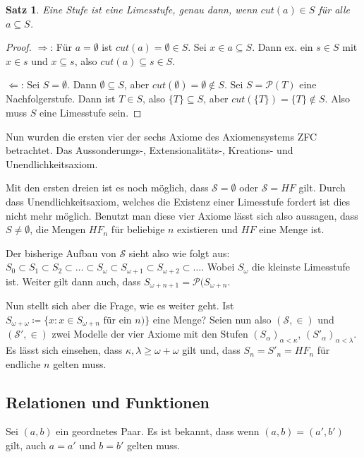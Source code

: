 \documentclass[german]{article}
\theoremstyle{break}
\theoremstyle{def_style}
\theoremstyle{def_style}
\newtheorem{satz}{Satz}[section]
\theoremstyle{lemma_style}
\newcommand{\Pot}[1]{\mathcal{P}(#1)}
\begin{document}
\begin{satz}
	Eine Stufe ist eine Limesstufe, genau dann, wenn $cut(a)\in S$ für alle $a\subseteq S$.
\end{satz}
\begin{proof}
	$\Rightarrow$: Für $a=\emptyset$ ist $cut(a)=\emptyset \in S$. Sei $x \in a \subseteq S$. Dann ex. ein $s\in S$ mit $x\in s$ und $x\subseteq s$, also $cut(a)\subseteq s \in S$.
	
	$\Leftarrow$: Sei $S=\emptyset$. Dann $\emptyset\subseteq S$, aber $cut(\emptyset)=\emptyset\notin S$. 
	Sei $S=\Pot{T}$ eine Nachfolgerstufe. Dann ist $T\in S$, also $\{T\}\subseteq S$, aber $cut(\{T\})=\{T\}\notin S$. Also muss $S$ eine Limesstufe sein.
\end{proof}


Nun wurden die ersten vier der sechs Axiome des Axiomensystems ZFC betrachtet. Das Aussonderungs-, Extensionalitäts-, Kreations- und Unendlichkeitsaxiom.

Mit den ersten dreien ist es noch möglich, dass $\mathcal{S}=\emptyset$ oder $\mathcal{S}=HF$ gilt. Durch dass Unendlichkeitsaxiom, welches die Existenz einer Limesstufe fordert ist dies nicht mehr möglich. 
Benutzt man diese vier Axiome lässt sich also aussagen, dass $S\neq \emptyset$, die Mengen $HF_n$ für beliebige $n$ existieren und $HF$ eine Menge ist.

Der bisherige Aufbau von $\mathcal{S}$ sieht also wie folgt aus: $S_0\subset S_1\subset S_2 \subset \dots \subset S_\omega \subset S_{\omega+1}\subset S_{\omega+2}\subset \dots$. Wobei $S_\omega$ die kleinste Limesstufe ist. Weiter gilt dann auch, dass $S_{\omega+n+1}=\Pot{S_{\omega+n}$. 
	
Nun stellt sich aber die Frage, wie es weiter geht. Ist $S_{\omega+\omega}\coloneqq\{x : x\in S_{\omega+n} \text{ für ein } n}\}$ eine Menge? Seien nun also $(\mathcal{S}, \in)$ und $(\mathcal{S}', \in)$ zwei Modelle der vier Axiome mit den Stufen $(S_\alpha)_{\alpha<\kappa}$, $(S'_\alpha)_{\alpha<\lambda}$. Es lässt sich einsehen, dass $\kappa,\lambda \geq \omega+\omega$ gilt und, dass $S_n=S'_n=HF_n$ für endliche $n$ gelten muss.

\subsection{Relationen und Funktionen}

Sei $(a,b)$ ein geordnetes Paar. Es ist bekannt, dass wenn $(a,b)=(a', b')$ gilt, auch $a=a'$ und $b=b'$ gelten muss.
\end{document}
